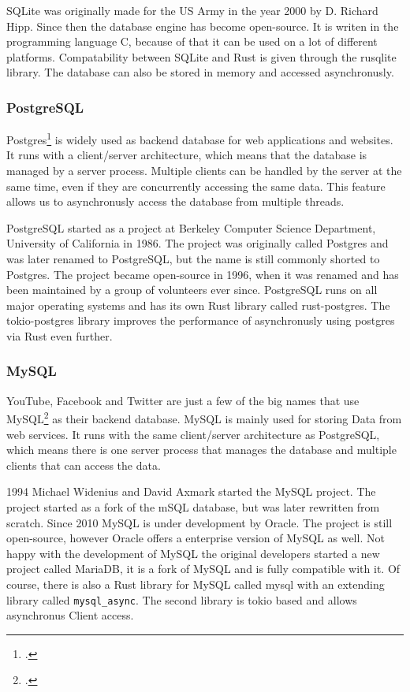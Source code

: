 SQLite was originally made for the US Army in the year 2000 by D. Richard Hipp. Since then the database engine has become open-source. It is writen in the programming language
C, because of that it can be used on a lot of different platforms. Compatability between SQLite and Rust is given through the rusqlite library. The database can also be stored
in memory and accessed asynchronusly. 

\subsubsection{PostgreSQL}
Postgres\footcite{postgres} is widely used as backend database for web applications and websites. It runs with a client/server architecture, which means that the database is 
managed by a server process. Multiple clients can be handled by the server at the same time, even if they are concurrently accessing the same data. This feature allows us to 
asynchronusly access the database from multiple threads.   

PostgreSQL started as a project at Berkeley Computer Science Department, University of California in 1986. The project was originally called Postgres and was later renamed to
PostgreSQL, but the name is still commonly shorted to Postgres. The project became open-source in 1996, when it was renamed and has been maintained by a group of volunteers 
ever since. PostgreSQL runs on all major operating systems and has its own Rust library called rust-postgres. The tokio-postgres library improves the performance of
asynchronusly using postgres via Rust even further.

\subsubsection{MySQL}
YouTube, Facebook and Twitter are just a few of the big names that use MySQL\footcite{mysql} as their backend database. MySQL is mainly used for storing Data from web services. 
It runs with the same client/server architecture as PostgreSQL, which means there is one server process that manages the database and multiple clients that can access the data.  

1994 Michael Widenius and David Axmark started the MySQL project. The project started as a fork of the mSQL database, but was later rewritten from scratch. Since 2010 MySQL is
under development by Oracle. The project is still open-source, however Oracle offers a enterprise version of MySQL as well. Not happy with the development of MySQL the 
original developers started a new project called MariaDB, it is a fork of MySQL and is fully compatible with it. 
Of course, there is also a Rust library for MySQL called mysql with an extending library called \verb+mysql_async+. The second library is tokio based and allows asynchronus Client 
access.

